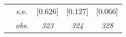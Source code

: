 \begin{table}[H]
\begin{centering}
\begin{tabular}{ r c ccc}
	 & s.e.	 & [0.626]	 & [0.127]	 & [0.066]	\\
	 & \textit{obs.}	 & \textit{323}	 & \textit{324}	 & \textit{328}	\\
\hline		
\end{tabular}		
\par\end{centering}
\end{table}					
